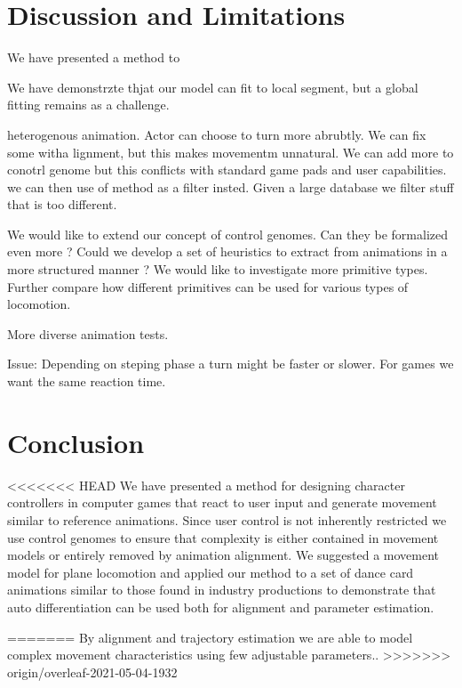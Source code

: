 \section{Discussion and Limitations}
We have presented a method to 

We have demonstrzte thjat our model can fit to local segment, but a global fitting remains as a challenge.

heterogenous animation. Actor can choose to turn more abrubtly. We can fix some witha lignment, but this makes movementm unnatural. We can add more to conotrl genome but this conflicts with standard game pads and user capabilities. we can then use of method as a filter insted. Given a large database we filter stuff that is too different.


We would like to extend our concept of control genomes. Can they be formalized even more ? Could we develop a set of heuristics to extract from animations in a more structured manner ? 
We would like to investigate more primitive types. Further compare how different primitives can be used for various types of locomotion.

More diverse animation tests.


Issue: Depending on steping phase a turn might be faster or slower. For games we want the same reaction time.

\section{Conclusion}
<<<<<<< HEAD
We have presented a method for designing character controllers in computer games that react to user input and generate movement similar to reference animations. Since user control is not inherently restricted we use control genomes to ensure that complexity is either contained in movement models or entirely removed by animation alignment. We suggested a movement model for plane locomotion and applied our method to a set of dance card animations similar to those found in industry productions to demonstrate that auto differentiation can be used both for alignment and parameter estimation.  

=======
By alignment and trajectory estimation we are able to model complex movement characteristics using few adjustable parameters..
\blindtext
>>>>>>> origin/overleaf-2021-05-04-1932


